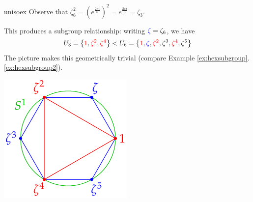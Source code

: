 \begin{examples}{}{unisoex}
	\exstart Observe that $\zeta_6^2=(e^{\frac{2\pi i}6})^2 =e^{\frac{2\pi i}3} =\zeta_3$.\par
	\begin{enumerate}\setcounter{enumi}{1}
		\begin{minipage}[t]{0.75\linewidth}\vspace{-8pt}
			\item[]This produces a subgroup relationship: writing $\textcolor{blue}{\zeta}=\zeta_6$, we have
			\[
				U_3 = \bigl\{\textcolor{red}{1},\textcolor{red}{\zeta^2},\textcolor{red}{\zeta^4}\bigr\}  < U_6 = \bigl\{\textcolor{red}{1},\textcolor{blue}{\zeta},\textcolor{red}{\zeta^2},\zeta^3,\textcolor{red}{\zeta^4},\zeta^5\bigr\}
			\]
			The picture makes this geometrically trivial (compare Example \ref*{ex:hexsubgroup}.\ref{ex:hexsubgroup2}).
		\end{minipage}
		\hfill
		\begin{minipage}[t]{0.24\linewidth}\vspace{-32pt}
			\flushright\includegraphics[scale=0.8]{cyclic-hexagon}
		\end{minipage}
	  

\end{enumerate}
\end{examples}
